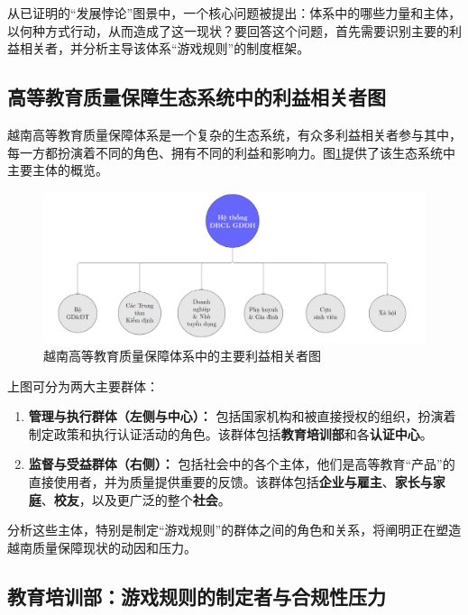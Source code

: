 从已证明的“发展悖论”图景中，一个核心问题被提出：体系中的哪些力量和主体，以何种方式行动，从而造成了这一现状？要回答这个问题，首先需要识别主要的利益相关者，并分析主导该体系“游戏规则”的制度框架。

\subsection{高等教育质量保障生态系统中的利益相关者图}

越南高等教育质量保障体系是一个复杂的生态系统，有众多利益相关者参与其中，每一方都扮演着不同的角色、拥有不同的利益和影响力。图\ref{fig:so_do_he_thong_dbcl}提供了该生态系统中主要主体的概览。

\begin{figure}[h!]
    \centering
    \includegraphics[width=\textwidth]{image/he_thong_dbcl_gddh.jpg}
    \caption{越南高等教育质量保障体系中的主要利益相关者图}
    \label{fig:so_do_he_thong_dbcl}
\end{figure}

上图可分为两大主要群体：
\begin{enumerate}
    \item \textbf{管理与执行群体（左侧与中心）：} 包括国家机构和被直接授权的组织，扮演着制定政策和执行认证活动的角色。该群体包括\textbf{教育培训部}和各\textbf{认证中心}。
    \item \textbf{监督与受益群体（右侧）：} 包括社会中的各个主体，他们是高等教育“产品”的直接使用者，并为质量提供重要的反馈。该群体包括\textbf{企业与雇主}、\textbf{家长与家庭}、\textbf{校友}，以及更广泛的整个\textbf{社会}。
\end{enumerate}
分析这些主体，特别是制定“游戏规则”的群体之间的角色和关系，将阐明正在塑造越南质量保障现状的动因和压力。

\subsection{教育培训部：游戏规则的制定者与合规性压力}
\label{subsec:vai_tro_moet}

